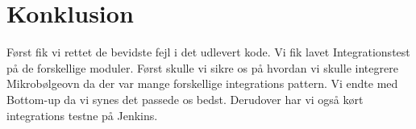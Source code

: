 \section{Konklusion}
Først fik vi rettet de bevidste fejl i det udlevert kode. Vi fik lavet Integrationstest på de forskellige moduler. Først skulle vi sikre os på hvordan vi skulle integrere Mikrobølgeovn da der var mange forskellige integrations pattern. Vi endte med Bottom-up da vi synes det passede os bedst. Derudover har vi også kørt integrations testne på Jenkins.